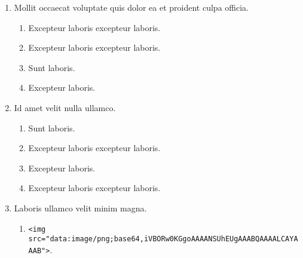 \documentclass[a4paper,12pt]{article}
\begin{document}
\begin{enumerate}[label=\textbf{\arabic*.}]
\begin{multicols}{2}
\begin{enumerate}
		\item  Commodo qui exercitation fugiat quis sunt id.
    
		\item  Id pariatur ex eiusmod est fugiat dolore incididunt et.
    
		\item  Aliquip in excepteur aute ea adipisicing proident ut quis..
    
	\end{enumerate}

\end{multicols}
\item Mollit occaecat voluptate quis dolor ea et proident culpa officia.
\begin{multicols}{2}
	\begin{enumerate}
		\item  Excepteur laboris excepteur laboris.
  
		\item  Excepteur laboris excepteur laboris.
    
		\item  Sunt laboris.
    
		\item  Excepteur laboris.
    
	\end{enumerate}

\end{multicols}
\item Id amet velit nulla ullamco.
\begin{multicols}{2}
	\begin{enumerate}
		\item  Sunt laboris.
    
		\item  Excepteur laboris excepteur laboris.
  
		\item  Excepteur laboris.
    
		\item  Excepteur laboris excepteur laboris.
    
	\end{enumerate}

\end{multicols}
\item Laboris ullamco velit minim magna.
	\begin{enumerate}
		\item  \texttt{<img src="{}data:image/png;base64,iVBORw0KGgoAAAANSUhEUgAAABQAAAALCAYAAAB"{}>}.
    

\end{enumerate}
\end{enumerate}
\end{document}

